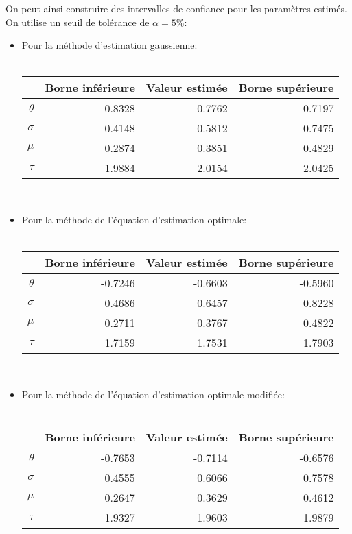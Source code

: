 On peut ainsi construire des intervalles de confiance pour les
paramètres estimés. On utilise un seuil de tolérance de $\alpha=5\%$:
\begin{itemize}
\item Pour la méthode d'estimation gaussienne:\\ \\
  \begin{tabular}{rrrr}
    \hline
    & \textbf{Borne inférieure} & \textbf{Valeur estimée} & \textbf{Borne supérieure} \\
    \hline
    $\theta$ & -0.8328 & -0.7762 & -0.7197 \\ 
    $\sigma$ & 0.4148 & 0.5812 & 0.7475 \\ 
    $\mu$ & 0.2874 & 0.3851 & 0.4829 \\ 
    $\tau$ & 1.9884 & 2.0154 & 2.0425 \\ 
    \hline
  \end{tabular}\\

\item Pour la méthode de l'équation d'estimation optimale:\\ \\
  \begin{tabular}{rrrr}
    \hline
    & \textbf{Borne inférieure} & \textbf{Valeur estimée} & \textbf{Borne supérieure} \\
    \hline
    $\theta$ & -0.7246 & -0.6603 & -0.5960 \\ 
    $\sigma$ & 0.4686 & 0.6457 & 0.8228 \\ 
    $\mu$ & 0.2711 & 0.3767 & 0.4822 \\ 
    $\tau$ & 1.7159 & 1.7531 & 1.7903 \\ 
    \hline
  \end{tabular}\\

\item Pour la méthode de l'équation d'estimation optimale modifiée:\\ \\
\begin{tabular}{rrrr}
  \hline 
  & \textbf{Borne inférieure} & \textbf{Valeur estimée} & \textbf{Borne supérieure} \\ 
  \hline
  $\theta$ & -0.7653 & -0.7114 & -0.6576 \\ 
  $\sigma$ & 0.4555 & 0.6066 & 0.7578 \\ 
  $\mu$ & 0.2647 & 0.3629 & 0.4612 \\ 
  $\tau$ & 1.9327 & 1.9603 & 1.9879 \\ 
  \hline
\end{tabular}\\

\end{itemize}


